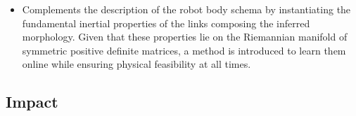 \documentclass[12pt, a4paper]{article}
\newcommand{\redtext}[1]{\textcolor{red}{#1}}
\begin{document}
\begin{itemize}
	\item Complements the description of the robot body schema by instantiating the fundamental inertial properties of the links composing the inferred morphology. Given that these properties lie on the Riemannian manifold of symmetric positive definite matrices, a method is introduced to learn them online while ensuring physical feasibility at all times.

\end{itemize}

\subsection*{Impact}
\end{document}
